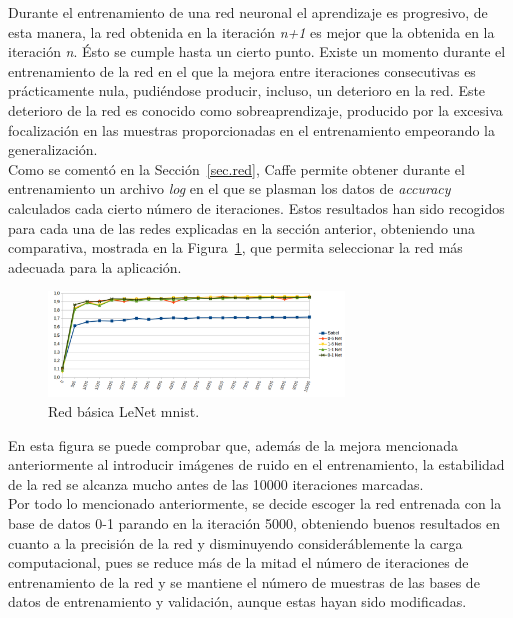 Durante el entrenamiento de una red neuronal el aprendizaje es progresivo, de esta manera, la red obtenida en la iteración \textit{n+1} es mejor que la obtenida en la iteración \textit{n}. Ésto se cumple hasta un cierto punto. Existe un momento durante el entrenamiento de la red en el que la mejora entre iteraciones consecutivas es prácticamente nula, pudiéndose producir, incluso, un deterioro en la red. Este deterioro de la red es conocido como sobreaprendizaje, producido por la excesiva focalización en las muestras proporcionadas en el entrenamiento empeorando la generalización.\\

Como se comentó en la Sección~\ref{sec.red}, Caffe permite obtener durante el entrenamiento un archivo \textit{log} en el que se plasman los datos de \textit{accuracy} calculados cada cierto número de iteraciones. Estos resultados han sido recogidos para cada una de las redes explicadas en la sección anterior, obteniendo una comparativa, mostrada en la Figura~\ref{fig.iteraciones}, que permita seleccionar la red más adecuada para la aplicación.
\begin{figure}[H]
	\begin{center}
		\includegraphics[width=0.7\textwidth]{figures/iteraciones}
		\caption{Red básica LeNet \acrshort{mnist}.}
		\label{fig.iteraciones}
	\end{center}
\end{figure}
En esta figura se puede comprobar que, además de la mejora mencionada anteriormente al introducir imágenes de ruido en el entrenamiento, la estabilidad de la red se alcanza mucho antes de las 10000 iteraciones marcadas.\\

Por todo lo mencionado anteriormente, se decide escoger la red entrenada con la base de datos 0-1 parando en la iteración 5000, obteniendo buenos resultados en cuanto a la precisión de la red y disminuyendo consideráblemente la carga computacional, pues se reduce más de la mitad el número de iteraciones de entrenamiento de la red y se mantiene el número de muestras de las bases de datos de entrenamiento y validación, aunque estas hayan sido modificadas.\\


